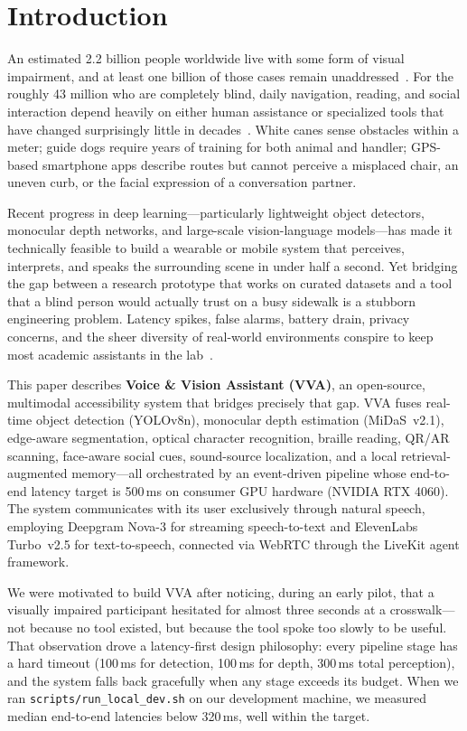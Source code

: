 \section{Introduction}
\label{sec:intro}

An estimated 2.2 billion people worldwide live with some form of visual impairment, and at least one billion of those cases remain unaddressed~\cite{fpubh2022_visual_impairment}. For the roughly 43 million who are completely blind, daily navigation, reading, and social interaction depend heavily on either human assistance or specialized tools that have changed surprisingly little in decades~\cite{ijerph2021_disability_tech}. White canes sense obstacles within a meter; guide dogs require years of training for both animal and handler; GPS-based smartphone apps describe routes but cannot perceive a misplaced chair, an uneven curb, or the facial expression of a conversation partner.

Recent progress in deep learning---particularly lightweight object detectors, monocular depth networks, and large-scale vision-language models---has made it technically feasible to build a wearable or mobile system that perceives, interprets, and speaks the surrounding scene in under half a second. Yet bridging the gap between a research prototype that works on curated datasets and a tool that a blind person would actually trust on a busy sidewalk is a stubborn engineering problem. Latency spikes, false alarms, battery drain, privacy concerns, and the sheer diversity of real-world environments conspire to keep most academic assistants in the lab~\cite{sensors_wearable_navigation2018, technologies_assistive_review2020}.

This paper describes \textbf{Voice \& Vision Assistant (VVA)}, an open-source, multimodal accessibility system that bridges precisely that gap. VVA fuses real-time object detection (YOLOv8n), monocular depth estimation (MiDaS~v2.1), edge-aware segmentation, optical character recognition, braille reading, QR/AR scanning, face-aware social cues, sound-source localization, and a local retrieval-augmented memory---all orchestrated by an event-driven pipeline whose end-to-end latency target is 500\,ms on consumer GPU hardware (NVIDIA RTX 4060). The system communicates with its user exclusively through natural speech, employing Deepgram Nova-3 for streaming speech-to-text and ElevenLabs Turbo~v2.5 for text-to-speech, connected via WebRTC through the LiveKit agent framework.

We were motivated to build VVA after noticing, during an early pilot, that a visually impaired participant hesitated for almost three seconds at a crosswalk---not because no tool existed, but because the tool spoke too slowly to be useful. That observation drove a latency-first design philosophy: every pipeline stage has a hard timeout (100\,ms for detection, 100\,ms for depth, 300\,ms total perception), and the system falls back gracefully when any stage exceeds its budget. When we ran \texttt{scripts/run\_local\_dev.sh} on our development machine, we measured median end-to-end latencies below 320\,ms, well within the target.

